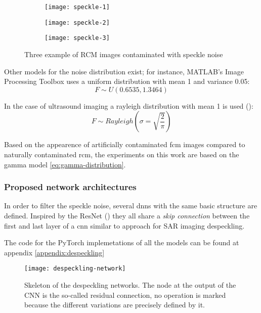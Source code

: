 \documentclass[../main.tex]{subfiles}
\begin{document}
\begin{figure}[h]
\centering
\begin{subfigure}{.3\textwidth}
  \centering
  \texttt{[image: speckle-1]}
\end{subfigure}%
\begin{subfigure}{.3\textwidth}
  \centering
  \texttt{[image: speckle-2]}
\end{subfigure}%
\begin{subfigure}{.3\textwidth}
  \centering
  \texttt{[image: speckle-3]}
\end{subfigure}
\caption{Three example of RCM images contaminated with speckle noise}
\label{fig:speckle}
\end{figure}

Other models for the noise distribution exist; for instance, MATLAB's
Image Processing Toolbox uses a uniform distribution with mean 1 and
variance 0.05:
\begin{equation}
F \sim U(0.6535,1.3464)
\end{equation}

In the case of ultrasound imaging a rayleigh distribution with mean 1 is used
(\cite{RayleighSpeckle}):
\begin{equation}
F \sim Rayleigh(\sigma=\sqrt{\frac{2}{\pi}})
\end{equation}

Based on the appearence of artificially contaminated \gls{fcm} images compared to
naturally contaminated \gls{rcm}, the experiments on this work are based on the
gamma model \eqref{eq:gamma-distribution}.

\subsubsection{Proposed network architectures}
In order to filter the speckle noise, several \glspl{dnn} with the same basic
structure are defined. Inspired by the ResNet (\cite{he2015deep}) they all share a
\emph{skip connection} between the first and last layer of a \gls{cnn} similar to
\cite{Wang2018} approach for SAR imaging despeckling.

The code for the PyTorch implemetations of all the models can be found at
appendix \ref{appendix:despeckling}

\begin{figure}[H]
\centering
\texttt{[image: despeckling-network]}
\caption{Skeleton of the despeckling networks. The node at the output of the
CNN is the so-called residual connection, no operation is marked because
the different variations are precisely defined by it.}
\label{fig:despeckling-network}
\end{figure}
\end{document}
